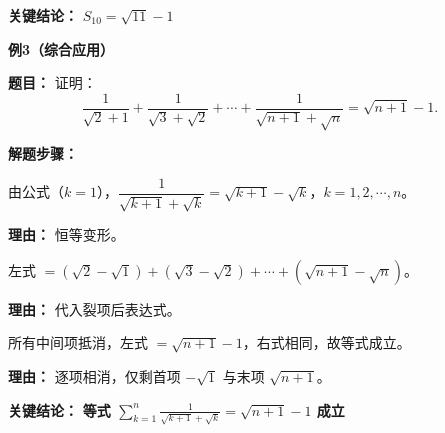 \begin{examplebox}
	\textbf{\textcolor{CExample}{关键结论：}}
	\textbf{$S_{10}=\sqrt{11}-1$}

	\medskip
	\textbf{\textcolor{CExample}{例3（综合应用）}}

	\textbf{\textcolor{CExample}{题目：}}
	证明：
	\[
		\frac{1}{\sqrt{2}+1}+\frac{1}{\sqrt{3}+\sqrt{2}}+\cdots+\frac{1}{\sqrt{n+1}+\sqrt{n}}=\sqrt{n+1}-1.
	\]

	\textbf{\textcolor{CExample}{解题步骤：}}
	\begin{description}[style=nextline, leftmargin=2.8em, labelsep=0.5em, itemsep=0.45em]
		\item[\textbf{第一步（裂每一项）：}] 由公式（$k=1$），$\dfrac{1}{\sqrt{k+1}+\sqrt{k}}=\sqrt{k+1}-\sqrt{k}$，$k=1,2,\cdots,n$。
			\par\textbf{理由：} 恒等变形。
		\item[\textbf{第二步（求和相消）：}] 左式 $=(\sqrt{2}-\sqrt{1})+(\sqrt{3}-\sqrt{2})+\cdots+(\sqrt{n+1}-\sqrt{n})$。
			\par\textbf{理由：} 代入裂项后表达式。
		\item[\textbf{第三步（化简结果）：}] 所有中间项抵消，左式 $=\sqrt{n+1}-1$，右式相同，故等式成立。
			\par\textbf{理由：} 逐项相消，仅剩首项 $-\sqrt{1}$ 与末项 $\sqrt{n+1}$。
	\end{description}

	\textbf{\textcolor{CExample}{关键结论：}}
	\textbf{等式 $\displaystyle\sum_{k=1}^{n}\frac{1}{\sqrt{k+1}+\sqrt{k}}=\sqrt{n+1}-1$ 成立}
\end{examplebox}
